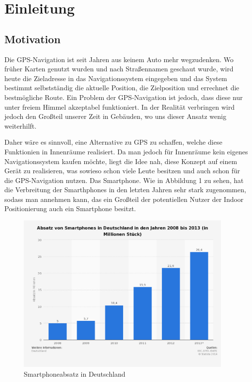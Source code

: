 \chapter{Einleitung}
\label{chap:introduction}

\section{Motivation}
\label{sec:introduction:motivation}

Die GPS-Navigation ist seit Jahren aus keinem Auto mehr wegzudenken. Wo früher Karten genutzt wurden und nach Straßennamen geschaut wurde, wird heute die Zieladresse in das Navigationssystem eingegeben und das System bestimmt selbstständig die aktuelle Position, die Zielposition und errechnet die bestmögliche Route.
Ein Problem der GPS-Navigation ist jedoch, dass diese nur unter freiem Himmel akzeptabel funktioniert.
In der Realität verbringen wird jedoch den Großteil unserer Zeit in Gebäuden, wo uns dieser Ansatz wenig weiterhilft. 

Daher wäre es sinnvoll, eine Alternative zu GPS zu schaffen, welche diese Funktionien in Innenräume realisiert.
Da man jedoch für Innenräume kein eigenes Navigationssystem kaufen möchte, liegt die Idee nah, diese Konzept auf einem Gerät zu realisieren, was sowieso schon viele Leute besitzen und auch schon für die GPS-Navigation nutzen. 
Das Smartphone.
Wie in Abbildung 1 zu sehen, hat die Verbreitung der Smarthphones in den letzten Jahren sehr stark zugenommen, sodass man annehmen kann, das ein Großteil der potentiellen Nutzer der Indoor Positionierung auch ein Smartphone besitzt.
\begin{figure}[htb]
	\centering
		\includegraphics[height=8cm]{pictures/statistik-smartphonenutzung.png}
		\caption{Smartphoneabsatz in Deutschland}
\end{figure}

